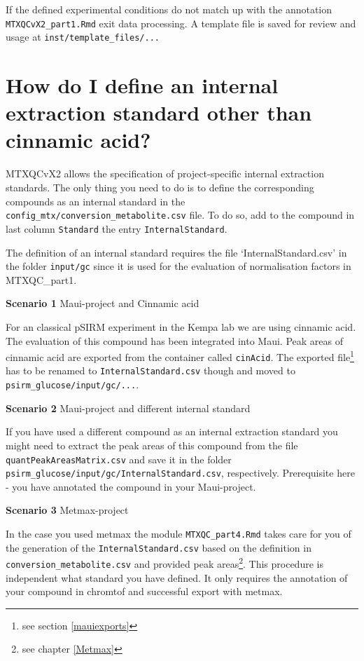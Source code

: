 \documentclass[]{book}
\let\rmarkdownfootnote\footnote%
\def\footnote{\protect\rmarkdownfootnote}
\theoremstyle{definition}
\theoremstyle{definition}
\theoremstyle{definition}
\theoremstyle{remark}
\begin{document}
If the defined experimental conditions do not match up with the
annotation \texttt{MTXQCvX2\_part1.Rmd} exit data processing. A template
file is saved for review and usage at \texttt{inst/template\_files/...}

\section{How do I define an internal extraction standard other than
cinnamic acid?}\label{definternal}

MTXQCvX2 allows the specification of project-specific internal
extraction standards. The only thing you need to do is to define the
corresponding compounds as an internal standard in the
\texttt{config\_mtx/conversion\_metabolite.csv} file. To do so, add to
the compound in last column \texttt{Standard} the entry
\texttt{InternalStandard}.

The definition of an internal standard requires the file
`InternalStandard.csv' in the folder \texttt{input/gc} since it is used
for the evaluation of normalisation factors in MTXQC\_part1.

\textbf{Scenario 1} Maui-project and Cinnamic acid

For an classical pSIRM experiment in the Kempa lab we are using cinnamic
acid. The evaluation of this compound has been integrated into Maui.
Peak areas of cinnamic acid are exported from the container called
\texttt{cinAcid}. The exported file\footnote{see section
  \ref{mauiexports}} has to be renamed to \texttt{InternalStandard.csv}
though and moved to \texttt{psirm\_glucose/input/gc/...}.

\textbf{Scenario 2} Maui-project and different internal standard

If you have used a different compound as an internal extraction standard
you might need to extract the peak areas of this compound from the file
\texttt{quantPeakAreasMatrix.csv} and save it in the folder
\texttt{psirm\_glucose/input/gc/InternalStandard.csv}, respectively.
Prerequisite here - you have annotated the compound in your
Maui-project.

\textbf{Scenario 3} Metmax-project

In the case you used metmax the module \texttt{MTXQC\_part4.Rmd} takes
care for you of the generation of the \texttt{InternalStandard.csv}
based on the definition in \texttt{conversion\_metabolite.csv} and
provided peak areas\footnote{see chapter \ref{Metmax}}. This procedure
is independent what standard you have defined. It only requires the
annotation of your compound in chromtof and successful export with
metmax.
\end{document}
